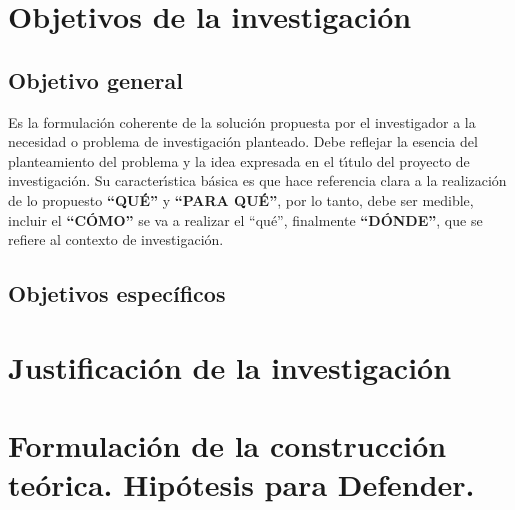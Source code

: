 \section{Objetivos de la investigaci\'on}
\label{cap0:sec:objetivos_de_la_investigacion}

\subsection{Objetivo general}
\label{cap0:sec:objetivo_general}

Es la formulaci\'{o}n coherente de la soluci\'{o}n propuesta por el investigador a la necesidad o 
problema de investigaci\'{o}n planteado. Debe reflejar la esencia del planteamiento del problema y 
la idea expresada en el t\'{\i}tulo del proyecto de investigaci\'{o}n. Su caracter\'{\i}stica 
b\'{a}sica es que hace referencia clara a la realizaci\'{o}n de lo propuesto \textbf{``QU\'{E}''} y 
\textbf{``PARA QU\'{E}''}, por lo tanto, debe ser medible, incluir el \textbf{``C\'{O}MO''} se va 
a realizar el ``qu\'{e}'', finalmente \textbf{``D\'{O}NDE''}, que se refiere al contexto de 
investigaci\'{o}n. 


\subsection{Objetivos espec\'ificos}
\label{cap0:sec:objetivos_especificos}



\section{Justificaci\'on de la investigaci\'on }
\label{cap0:sec:justificacion_de_la_investigacion}



\section{Formulaci\'on de la construcci\'on te\'orica. Hip\'otesis para Defender.}
\label{cap0:sec:formulacion_de_la_construccion_teorica}

